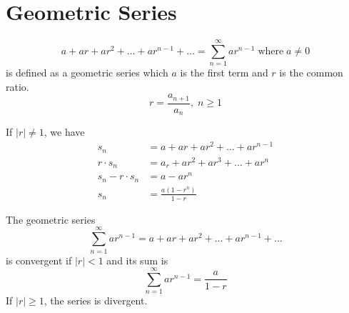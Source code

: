 \section{Geometric Series}

\begin{definition}
  \[
    a + ar + ar^{2} + \dots + ar^{n-1} + \dots = \sum_{n = 1}^{\infty} ar^{n-1} \; \text{where} \; a \neq 0
  \]
  is defined as a geometric series which \(a\) is the first term and \(r\) is the common ratio.
  \[
    r = \frac{a_{n+1}}{a_{n}}, \; n \geq 1
  \]
\end{definition}

\begin{lemma}
  If \(|r| \neq 1\), we have
  \begin{equation}
    \nonumber
    \begin{aligned}
      s_{n} &= a + ar + ar^{2} + \dots + ar^{n - 1} \\
      r \cdot s_{n} &= a_r + ar^{2} + ar^{3} + \dots + ar^{n} \\
      s_{n} - r \cdot s_{n} &= a - ar^{n} \\
      s_{n} &= \frac{a(1 - r^{n})}{1 - r}
    \end{aligned}
  \end{equation}
\end{lemma}

\begin{lemma}
  The geometric series
  \[
    \sum_{n = 1}^{\infty} ar^{n-1} = a + ar + ar^{2} + \dots + ar^{n-1} + \dots
  \]
  is convergent if \(|r| < 1\) and its sum is
  \[
    \sum_{n = 1}^{\infty} ar^{n-1} = \frac{a}{1 - r}  
  \]
  If \(|r| \geq 1\), the series is divergent.
\end{lemma}

